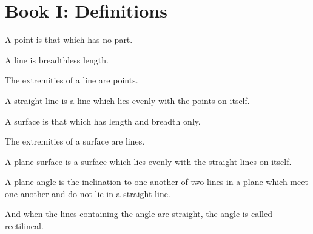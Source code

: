 
\section*{Book I: Definitions}
\label{sec:def-bookI}

\begin{scope}
\label{def:I.1}
A point is that which has no part.
\end{scope}

\begin{scope}
\label{def:I.2}
A line is breadthless length.
\end{scope}

\begin{scope}
\label{def:I.3}
The extremities of a line are points.
\end{scope}

\begin{scope}
\label{def:I.4}
A straight line is a line which lies evenly with the points on itself.
\end{scope}

\begin{scope}
\label{def:I.5}
A surface is that which has length and breadth only.
\end{scope}

\begin{scope}
\label{def:I.6}
The extremities of a surface are lines.
\end{scope}

\begin{scope}
\label{def:I.7}
A plane surface is a surface which lies evenly with the straight lines
on itself.
\end{scope}

\begin{scope}
\label{def:I.8}
A plane angle is the inclination to one another of two lines in a
plane which meet one another and do not lie in a straight line.
\end{scope}

\begin{scope}
\label{def:I.9}
And when the lines containing the angle are straight, the angle is
called rectilineal.
\end{scope}

